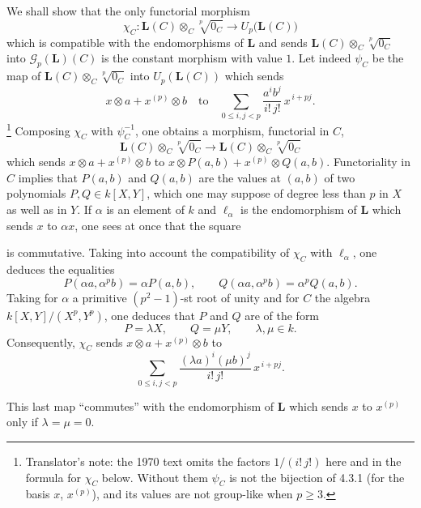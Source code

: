 We shall show that the only functorial morphism
\[
  \chi_C:
  \mathbf L(C)\otimes_C\sqrt[p]{0_C}
  \longrightarrow
  U_p\bigl(\mathbf L(C)\bigr)
\]
which is compatible with the endomorphisms of \(\mathbf L\) and
sends \(\mathbf L(C)\otimes_C\sqrt[p]{0_C}\) into
\(\mathscr G_p(\mathbf L)(C)\) is the constant morphism with value
\(1\). Let indeed \(\psi_C\) be the map of
\(\mathbf L(C)\otimes_C\sqrt[p]{0_C}\) into \(U_p(\mathbf L(C))\)
which sends
\[
  x\otimes a+x^{(p)}\otimes b
  \quad\text{to}\quad
  \sum_{0\leq i,j<p}
  \frac{a^i b^j}{i!\,j!}\,x^{\,i+pj}.
\]
\footnote{Translator's note: the 1970 text omits the factors \(1/(i!\,j!)\) here and in the formula for
\(\chi_C\) below. Without them \(\psi_C\) is not the bijection of 4.3.1 (for the basis \(x\), \(x^{(p)}\)),
and its values are not group-like when \(p\geq3\).}
Composing \(\chi_C\) with \(\psi_C^{-1}\), one obtains a morphism,
functorial in \(C\),
\[
  \mathbf L(C)\otimes_C\sqrt[p]{0_C}
  \longrightarrow
  \mathbf L(C)\otimes_C\sqrt[p]{0_C}
\]
which sends \(x\otimes a+x^{(p)}\otimes b\) to
\(x\otimes P(a,b)+x^{(p)}\otimes Q(a,b)\). Functoriality in \(C\)
implies that \(P(a,b)\) and \(Q(a,b)\) are the values at \((a,b)\) of
two polynomials \(P,Q\in k[X,Y]\), which one may suppose of degree
less than \(p\) in \(X\) as well as in \(Y\). If \(\alpha\) is an
element of \(k\) and \(\ell_\alpha\) is the endomorphism of
\(\mathbf L\) which sends \(x\) to \(\alpha x\), one sees at once that
the square
\begin{center}
  \label{sga3:VIIB:4.3.2:naturality-endomorphism-square}
  
\end{center}
is commutative. Taking into account the compatibility of \(\chi_C\)
with \(\ell_\alpha\), one deduces the equalities
\[
  P(\alpha a,\alpha^p b)=\alpha P(a,b),
  \qquad
  Q(\alpha a,\alpha^p b)=\alpha^p Q(a,b).
\]
Taking for \(\alpha\) a primitive \((p^2-1)\)-st root of unity and
for \(C\) the algebra \(k[X,Y]/(X^p,Y^p)\), one deduces that \(P\) and
\(Q\) are of the form
\[
  P=\lambda X,
  \qquad
  Q=\mu Y,
  \qquad
  \lambda,\mu\in k.
\]
Consequently, \(\chi_C\) sends \(x\otimes a+x^{(p)}\otimes b\) to
\[
  \sum_{0\leq i,j<p}
  \frac{(\lambda a)^i(\mu b)^j}{i!\,j!}\,x^{\,i+pj}.
\]

This last map ``commutes'' with the endomorphism of \(\mathbf L\)
which sends \(x\) to \(x^{(p)}\) only if \(\lambda=\mu=0\).

